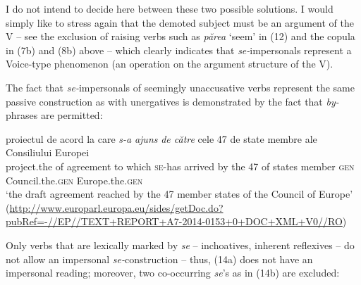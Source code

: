 \documentclass[output=paper]{langsci/langscibook}
\begin{document}
  I do not intend to decide here between these two possible solutions. I would simply like to stress again that the demoted subject must be an argument of the V – see the exclusion of raising verbs such as \textit{părea} ‘seem’ in (12) and the copula in (7b) and (8b) above – which clearly indicates that \textit{se-}impersonals represent a Voice-type phenomenon (an operation on the argument structure of the V). 

\z


The fact that \textit{se-}impersonals of seemingly unaccusative verbs represent the same passive construction as with unergatives is demonstrated by the fact that \textit{by-}phrases are permitted:

\ea 
\gll proiectul   de  acord         la care \emph{s-a}      \emph{ajuns}    \emph{de către} cele 47 de state membre ale   Consiliului          Europei \\
project.the of agreement to which \textsc{se-}has arrived by         the  47 of     states member {\textsc{gen}} Council.the.{\textsc{gen}} Europe.the.{\textsc{gen}}\\
\glt  ‘the draft agreement reached by the 47 member states of the Council of Europe'\\
(\url{http://www.europarl.europa.eu/sides/getDoc.do?pubRef=-//EP//TEXT+REPORT+A7-2014-0153+0+DOC+XML+V0//RO}\label{ex:giurgea:13})\\
\z

Only verbs that are lexically marked by \textit{se} – inchoatives, inherent reflexives – do not allow an impersonal \textit{se-}construction – thus, (14a) does not have an impersonal reading; moreover, two co-occurring \textit{se}’s as in (14b) are excluded:

\ea\label{ex:giurgea:14}
\z
\z
      
\end{document}
